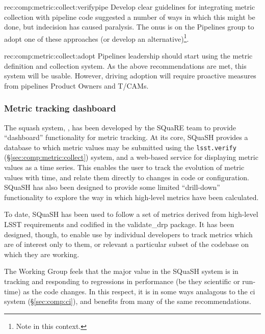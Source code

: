 \begin{recommendation}
    {rec:comp:metric:collect:verifypipe}
    {Develop clear guidelines for integrating metric collection with pipeline code}
     suggested a number of ways in which this might be done, but indecision has caused paralysis.
    The onus is on the Pipelines group to adopt one of these approaches (or develop an alternative)\footnote{Note  in this context.}.
\end{recommendation}

\begin{recommendation}
    {rec:comp:metric:collect:adopt}
    {Pipelines leadership should start using the metric definition and collection system.}
    As the above recommendations are met, this system will be usable.
    However, driving adoption will require proactive measures from pipelines Product Owners and T/CAMs.
\end{recommendation}

\subsubsection{Metric tracking dashboard}
\label{sec:comp:metric:dashboard}

The \gls{squash} system, , has been developed by the SQuaRE team to provide ``\gls{dashboard}'' functionality for metric tracking.
At its core, SQuaSH provides a database to which metric values may be submitted using the \texttt{lsst.verify} (\S\ref{sec:comp:metric:collect}) system, and a web-based service for displaying metric values as a time series.
This enables the user to track the evolution of metric values with time, and relate them directly to changes in code or configuration.
SQuaSH has also been designed to provide some limited ``drill-down'' functionality to explore the way in which high-level metrics have been calculated.

To date, SQuaSH has been used to follow a set of metrics derived from high-level LSST requirements and codified in the validate\_drp package.
It has been designed, though, to enable use by individual developers to track metrics which are of interest only to them, or relevant a particular subset of the codebase on which they are working.

The Working Group feels that the major value in the SQuaSH system is in tracking and responding to regressions in performance (be they scientific or run-time) as the code changes.
In this respect, it is in some ways analagous to the \gls{ci} system (\S\ref{sec:comp:ci}), and benefits from many of the same recommendations.


